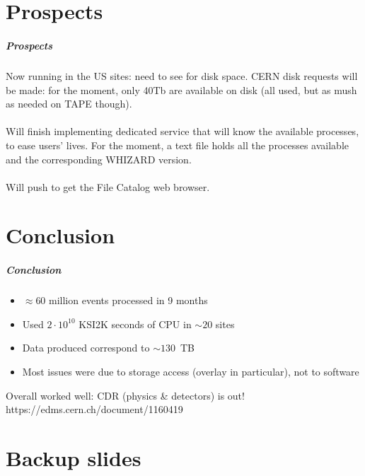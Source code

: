 \documentclass{beamer}
\begin{document}
\part{Prospects}
\begin{frame}
\partpage 
\end{frame}

\begin{frame}
\frametitle{Prospects} 
\alert{Now running in the US sites}: need to see for disk space. CERN disk requests will be made: 
for the moment, only 40Tb are available on disk (all used, but as mush as needed on TAPE though).\\
~\\
Will finish implementing dedicated service that \alert{will know the available processes}, to ease users' lives. 
For the moment, a text file holds all the processes available and the corresponding WHIZARD version.\\
~\\
Will push to get the \alert{File Catalog web browser}.
\end{frame}

\part{Conclusion}
\begin{frame}
\partpage 
\end{frame}

\begin{frame}
\frametitle{Conclusion} 
\begin{itemize}
\item $\approx 60$ million events processed in 9 months
\item Used $2\cdot 10^{10}$ KSI2K seconds of CPU in $\sim 20$ sites
\item Data produced correspond to $\sim 130$~TB
\item Most issues were due to storage access (overlay in particular), not to software
\end{itemize}
\alert{Overall worked well: CDR (physics \& detectors) is out!}\\
https://edms.cern.ch/document/1160419
\end{frame}

\appendix
\part{Backup slides}
\begin{frame}
\partpage 
\end{frame}
\end{document}
